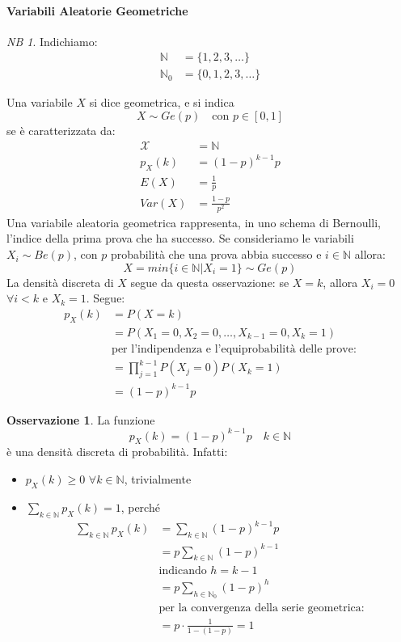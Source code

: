 \documentclass{article}
\theoremstyle{plain}
\theoremstyle{definition}
\newtheorem{osservazione}{Osservazione}[section]
\theoremstyle{remark}
\newtheorem*{NB}{NB}
\begin{document}
\paragraph{Variabili Aleatorie Geometriche} %
\label{par:variabili_aleatorie_geometriche}
\begin{NB}
	Indichiamo:
	\begin{align*}
		\mathds{N}&=\{1,2,3,\dots\}\\
		\mathds{N}_0&=\{0,1,2,3,\dots\}
	\end{align*}
\end{NB}
Una variabile $X$ si dice geometrica, e si indica
\begin{equation*}
	X\sim Ge(p)\quad\text{con }p\in[0,1]
\end{equation*}
se è caratterizzata da:
\begin{align*}
	\mathcal{X}&=\mathds{N}\\
	p_X(k)&=(1-p)^{k-1}p\\
	E(X)&=\frac{1}{p}\\
	Var(X)&=\frac{1-p}{p^2}
\end{align*}
Una variabile aleatoria geometrica rappresenta, in uno schema di Bernoulli, l'indice della prima prova che ha successo. Se consideriamo le variabili $X_i\sim Be(p)$, con $p$ probabilità che una prova abbia successo e $i\in\mathds{N}$ allora:
\begin{equation*}
	X=min\{i\in\mathds{N}|X_i=1\}\sim Ge(p)
\end{equation*}
La densità discreta di $X$ segue da questa osservazione: se $X=k$, allora $X_i=0$ $\forall i<k$ e $X_k=1$. Segue:
\begin{align*}
	p_X(k)&=P(X=k)\\
	&=P(X_1=0, X_2=0,\dots, X_{k-1}=0, X_k=1)\\
	&\text{per l'indipendenza e l'equiprobabilità delle prove:}\\
	&=\prod_{j=1}^{k-1} P(X_j=0)P(X_k=1)\\
	&=(1-p)^{k-1}p
\end{align*}
\begin{osservazione}
	La funzione
	\begin{equation*}
		p_X(k)=(1-p)^{k-1}p\quad k\in\mathds{N}
	\end{equation*}
	è una densità discreta di probabilità. Infatti:
	\begin{itemize}
		\item $p_X(k)\geq0$ $\forall k\in\mathds{N}$, trivialmente
		\item $\sum_{k\in\mathds{N}}p_X(k)=1$, perché
		\begin{align*}
			\sum_{k\in\mathds{N}}p_X(k)&=\sum_{k\in\mathds{N}}(1-p)^{k-1}p\\
			&=p\sum_{k\in\mathds{N}}(1-p)^{k-1}\\
			&\text{indicando }h=k-1\\
			&=p\sum_{h\in\mathds{N}_0}(1-p)^h\\
			&\text{per la convergenza della serie geometrica:}\\
			&=p\cdot\frac{1}{1-(1-p)}=1
		\end{align*}
	\end{itemize}
\end{osservazione}
\end{document}
